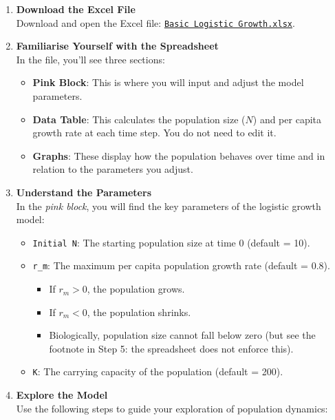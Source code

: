 \documentclass[
  a4paper]{book}
\providecommand{\tightlist}{%
  \setlength{\itemsep}{0pt}\setlength{\parskip}{0pt}}
\begin{document}
\begin{enumerate}
\def\labelenumi{\arabic{enumi}.}
\item
  \textbf{Download the Excel File}\\
  Download and open the Excel file: \href{https://www.dropbox.com/s/oxxyyn4zf4wsvkg/Basic\%20Logistic\%20Growth.xlsx?dl=1}{\texttt{Basic\ Logistic\ Growth.xlsx}}.
\item
  \textbf{Familiarise Yourself with the Spreadsheet}\\
  In the file, you'll see three sections:

  \begin{itemize}
  \tightlist
  \item
    \textbf{Pink Block}: This is where you will input and adjust the model parameters.
  \item
    \textbf{Data Table}: This calculates the population size (\(N\)) and per capita growth rate at each time step. You do not need to edit it.
  \item
    \textbf{Graphs}: These display how the population behaves over time and in relation to the parameters you adjust.
  \end{itemize}
\item
  \textbf{Understand the Parameters}\\
  In the \emph{pink block}, you will find the key parameters of the logistic growth model:

  \begin{itemize}
  \tightlist
  \item
    \texttt{Initial\ N}: The starting population size at time 0 (default = 10).
  \item
    \texttt{r\_m}: The maximum per capita population growth rate (default = 0.8).

    \begin{itemize}
    \tightlist
    \item
      If \(r_m > 0\), the population grows.
    \item
      If \(r_m < 0\), the population shrinks.
    \item
      Biologically, population size cannot fall below zero (but see the footnote in Step 5: the spreadsheet does not enforce this).
    \end{itemize}
  \item
    \texttt{K}: The carrying capacity of the population (default = 200).
  \end{itemize}
\item
  \textbf{Explore the Model}\\
  Use the following steps to guide your exploration of population dynamics:
\end{enumerate}
\end{document}
